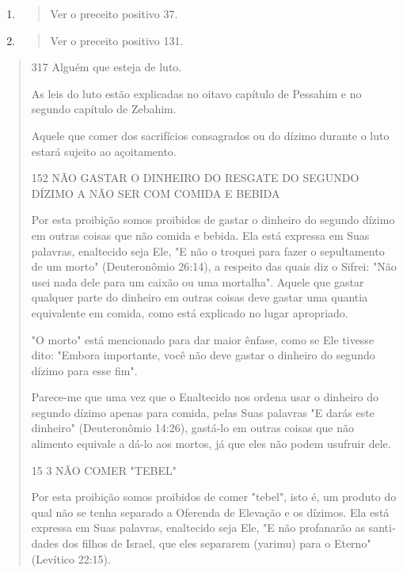 \begin{enumerate}
\def\labelenumi{\arabic{enumi}.}
\setcounter{enumi}{314}
\item
  \begin{quote}
  Ver o preceito positivo 37.
  \end{quote}
\item
  \begin{quote}
  Ver o preceito positivo 131.
  \end{quote}
\end{enumerate}

\begin{quote}
317 Alguém que esteja de luto.

As leis do luto estão explicadas no oitavo capítulo de Pessahim e no
segundo capítulo de Zebahim.

Aquele que comer dos sacrifícios consagrados ou do dízimo duran­te o
luto estará sujeito ao açoitamento.

152 NÃO GASTAR O DINHEIRO DO RESGATE DO SEGUNDO DÍZIMO A NÃO SER COM
COMIDA E BEBIDA

Por esta proibição somos proibidos de gastar o dinheiro do segun­do
dízimo em outras coisas que não comida e bebida. Ela está expressa em
Suas palavras, enaltecido seja Ele, "E não o troquei para fazer o
sepultamento de um morto" (Deuteronômio 26:14), a respeito das quais diz
o Sifrei: "Não usei nada dele para um caixão ou uma mortalha". Aquele
que gastar qualquer parte do dinheiro em outras coisas deve gastar uma
quantia equivalente em comida, co­mo está explicado no lugar apropriado.

"O morto" está mencionado para dar maior ênfase, como se Ele ti­vesse
dito: "Embora importante, você não deve gastar o dinheiro do segundo
dízimo para esse fim".

Parece-me que uma vez que o Enaltecido nos ordena usar o dinhei­ro do
segundo dízimo apenas para comida, pelas Suas palavras "E darás este
dinheiro" (Deuteronômio 14:26), gastá-lo em outras coisas que não
alimento equivale a dá-lo aos mortos, já que eles não podem usufruir
dele.

15 3 NÃO COMER "TEBEL"

Por esta proibição somos proibidos de comer "tebel", isto é, um pro­duto
do qual não se tenha separado a Oferenda de Elevação e os dízimos. Ela
está expressa em Suas palavras, enaltecido seja Ele, "E não profanarão
as santi­dades dos filhos de Israel, que eles separarem (yarimu) para o
Eterno" (Levítico 22:15).
\end{quote}

